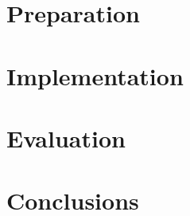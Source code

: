 \documentclass[a4paper, 12pt]{report}
\begin{document}
\chapter{Preparation}


\chapter{Implementation}


\chapter{Evaluation}


\chapter{Conclusions}



\begin{thebibliography}{9}

\end{thebibliography}
\end{document}
